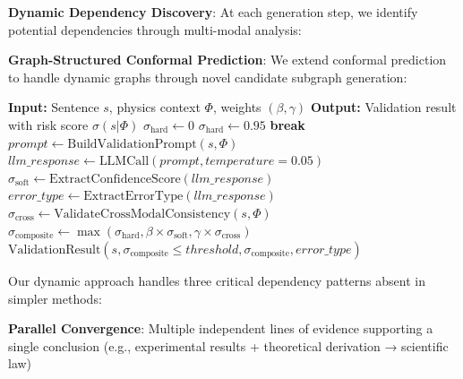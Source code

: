 \documentclass{uai2026} %
\theoremstyle{remark}
\theoremstyle{plain}
\theoremstyle{definition}
\begin{document}

\textbf{Dynamic Dependency Discovery}: At each generation step, we identify potential dependencies through multi-modal analysis:


\textbf{Graph-Structured Conformal Prediction}: We extend conformal prediction to handle dynamic graphs through novel candidate subgraph generation:
\begin{algorithm}
\caption{Scientific Sentence Validation}
\label{alg:validation}
\begin{algorithmic}[1]
\STATE \textbf{Input:} Sentence $s$, physics context $\Phi$, weights $(\beta, \gamma)$
\STATE \textbf{Output:} Validation result with risk score $\sigma(s|\Phi)$
\STATE {}
\STATE $\sigma_{\text{hard}} \leftarrow 0$
        \STATE $\sigma_{\text{hard}} \leftarrow 0.95$ 
        \STATE \textbf{break}
    \ENDIF
\ENDFOR
\STATE {}
\STATE $prompt \leftarrow \text{BuildValidationPrompt}(s, \Phi)$
\STATE $llm\_response \leftarrow \text{LLMCall}(prompt, temperature=0.05)$
\STATE $\sigma_{\text{soft}} \leftarrow \text{ExtractConfidenceScore}(llm\_response)$
\STATE $error\_type \leftarrow \text{ExtractErrorType}(llm\_response)$
\STATE {}
\STATE $\sigma_{\text{cross}} \leftarrow \text{ValidateCrossModalConsistency}(s, \Phi)$
\STATE {}
\STATE $\sigma_{\text{composite}} \leftarrow \max(\sigma_{\text{hard}}, \beta \times \sigma_{\text{soft}}, \gamma \times \sigma_{\text{cross}})$
\RETURN $\text{ValidationResult}(s, \sigma_{\text{composite}} \leq threshold, \sigma_{\text{composite}}, error\_type)$
\end{algorithmic}
\end{algorithm}

Our dynamic approach handles three critical dependency patterns absent in simpler methods:

\textbf{Parallel Convergence}: Multiple independent lines of evidence supporting a single conclusion (e.g., experimental results + theoretical derivation → scientific law)
\end{document}
